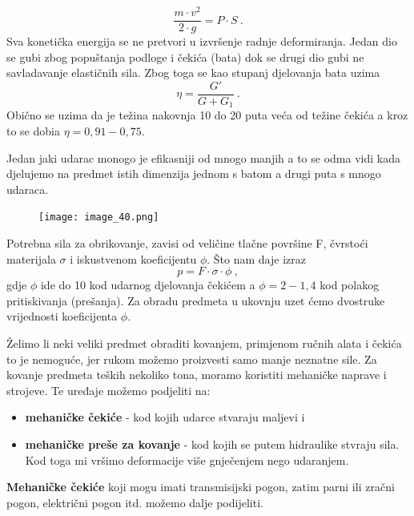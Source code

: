 \documentclass[a4paper,12pt]{article}
\numberwithin{figure}{section}
\begin{document}
\begin{equation}
\frac{m\cdot v^{2}}{2 \cdot g} = P\cdot S\:.
\end{equation}
Sva konetička energija se ne pretvori u izvršenje radnje deformiranja. Jedan dio se gubi zbog popuštanja podloge i čekića (bata) dok se drugi dio gubi ne savladavanje elastičnih sila. Zbog toga se kao  stupanj djelovanja bata uzima 
\begin{equation}
\eta = \frac{G'}{G + G_{1}}\:.
\end{equation}
Obično se uzima da je težina nakovnja 10 do 20 puta veća od težine čekića a kroz to se dobia $\eta = 0,91-0,75$.\par 
Jedan jaki udarac monogo je efikasniji od mnogo manjih a to se odma vidi kada djelujemo na predmet istih dimenzija jednom s batom a drugi puta s mnogo udaraca.
\begin{figure}[!h]
\centering
\texttt{[image: image\_40.png]}
\end{figure}
\FloatBarrier
Potrebna sila za obrikovanje, zavisi od veličine tlačne površine F, čvrstoći materijala $\sigma$ i iskustvenom koeficijentu $\phi$. Što nam daje izraz
\begin{equation}
p = F\cdot \sigma \cdot \phi \:,
\end{equation}
gdje $\phi$ ide do 10 kod udarnog djelovanja čekićem a $\phi = 2 - 1,4$ kod polakog pritiskivanja (prešanja). Za obradu predmeta u ukovnju uzet ćemo dvostruke vrijednosti koeficijenta $\phi$.\par 
Želimo li neki veliki predmet obraditi kovanjem, primjenom ručnih alata i čekića to je nemoguće, jer rukom možemo proizvesti samo manje neznatne sile. Za kovanje predmeta teških nekoliko tona, moramo koristiti mehaničke naprave i strojeve. Te uređaje možemo podjeliti na:
\begin{itemize}
\item \textbf{mehaničke čekiće} - kod kojih udarce stvaraju maljevi i
\item \textbf{mehaničke preše za kovanje} - kod kojih se putem hidraulike stvraju sila. Kod toga mi vršimo deformacije više gnječenjem nego udaranjem.
\end{itemize}
\par
\textbf{Mehaničke čekiće} koji mogu imati transmisijski pogon, zatim parni ili zračni pogon, električni pogon itd. možemo dalje podijeliti.
\end{document}

